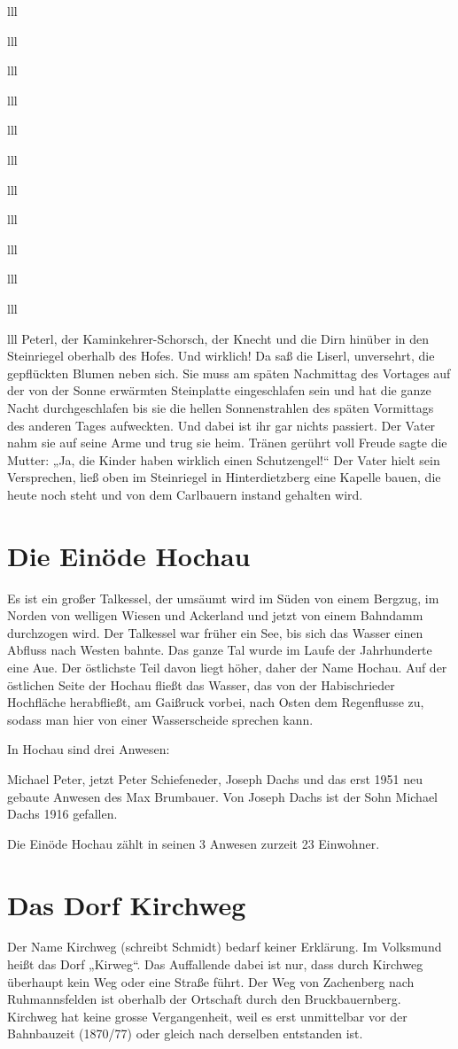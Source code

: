\documentclass[12pt,a4pager]{book}
\begin{document}
\begin{tabuluar}{lll}
\begin{tabuluar}{lll}
\begin{tabuluar}{lll}
\begin{tabuluar}{lll}
\begin{tabuluar}{lll}
\begin{tabuluar}{lll}
\begin{tabuluar}{lll}
\begin{tabuluar}{lll}
\begin{tabuluar}{lll}
\begin{tabuluar}{lll}
\begin{tabuluar}{lll}
\begin{tabuluar}{lll}
Peterl, der Kaminkehrer-Schorsch, der Knecht und die Dirn hinüber in den
Steinriegel oberhalb des Hofes. Und wirklich! Da saß die Liserl, unversehrt, die
gepflückten Blumen neben sich. Sie muss am späten Nachmittag des Vortages auf
der von der Sonne erwärmten Steinplatte eingeschlafen sein und hat die ganze
Nacht durchgeschlafen bis sie die hellen Sonnenstrahlen des späten Vormittags
des anderen Tages aufweckten. Und dabei ist ihr gar nichts passiert. Der Vater
nahm sie auf seine Arme und trug sie heim. Tränen gerührt voll Freude sagte die
Mutter: „Ja, die Kinder haben wirklich einen Schutzengel!“ Der Vater hielt sein
Versprechen, ließ oben im Steinriegel in Hinterdietzberg eine Kapelle bauen, die
heute noch steht und von dem Carlbauern instand gehalten wird.

\section{Die Einöde Hochau}

Es ist ein großer Talkessel, der umsäumt wird im Süden von einem Bergzug, im
Norden von welligen Wiesen und Ackerland und jetzt von einem Bahndamm durchzogen
wird. Der Talkessel war früher ein See, bis sich das Wasser einen Abfluss nach
Westen bahnte. Das ganze Tal wurde im Laufe der Jahrhunderte eine Aue. Der
östlichste Teil davon liegt höher, daher der Name Hochau. Auf der östlichen
Seite der Hochau fließt das Wasser, das von der Habischrieder Hochfläche
herabfließt, am Gaißruck vorbei, nach Osten dem Regenflusse zu, sodass man hier
von einer Wasserscheide sprechen kann.

In Hochau sind drei Anwesen:

Michael Peter, jetzt Peter Schiefeneder, Joseph Dachs und das erst 1951 neu
gebaute Anwesen des Max Brumbauer. Von Joseph Dachs ist der Sohn Michael Dachs
1916 gefallen.

Die Einöde Hochau zählt in seinen 3 Anwesen zurzeit 23 Einwohner.

\section{Das Dorf Kirchweg}

Der Name Kirchweg (schreibt Schmidt) bedarf keiner Erklärung. Im Volksmund heißt
das Dorf „Kirweg“. Das Auffallende dabei ist nur, dass durch Kirchweg überhaupt
kein Weg oder eine Straße führt. Der Weg von Zachenberg nach Ruhmannsfelden ist
oberhalb der Ortschaft durch den Bruckbauernberg. Kirchweg hat keine grosse
Vergangenheit, weil es erst unmittelbar vor der Bahnbauzeit (1870/77) oder
gleich nach derselben entstanden ist.


\end{tabuluar}
\end{tabuluar}
\end{tabuluar}
\end{tabuluar}
\end{tabuluar}
\end{tabuluar}
\end{tabuluar}
\end{tabuluar}
\end{tabuluar}
\end{tabuluar}
\end{tabuluar}
\end{tabuluar}
\end{document}
